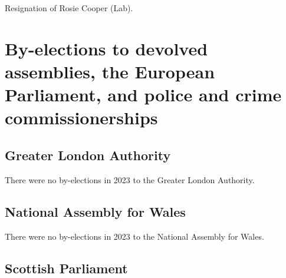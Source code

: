 \documentclass[a4paper,openany]{book}
\begin{document}

Resignation of Rosie Cooper (Lab).


\chapter{By-elections to devolved assemblies, the European Parliament, and police and crime commissionerships}

\section{Greater London Authority}

There were no by-elections in 2023 to the Greater London Authority.


\section{National Assembly for Wales}

There were no by-elections in 2023 to the National Assembly for Wales.


\section{Scottish Parliament}
\end{document}
